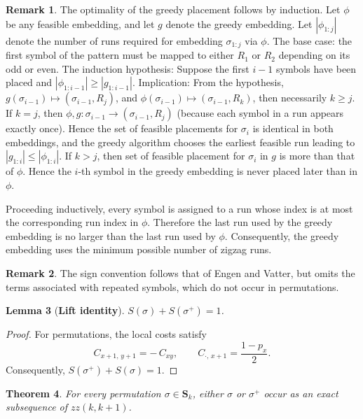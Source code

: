 \documentclass[a4paper,12pt]{article}
\newtheorem{theorem}{Theorem}[section]
\newtheorem{lemma}[theorem]{Lemma}
\theoremstyle{definition}
\newtheorem{rem}[theorem]{Remark}
\numberwithin{equation}{section}
\begin{document}
\begin{rem}
The optimality of the greedy placement follows by induction. 
Let $\phi$ be any
feasible embedding, and let $g$ denote the greedy embedding. Let $|\phi_{1:j}|$ denote the number of runs required for embedding $\sigma_{1:j}$ via $\phi$.
The base case:  the first symbol of the pattern must be mapped to either $R_1$ or $R_2$ depending on its odd or even.  
The induction hypothesis: Suppose the first
$i-1$ symbols have been placed and $|\phi_{1:i-1}| \geq |g_{1:i-1}|$. 
Implication: 
From the hypothesis, $
g(\sigma_{i-1}) \mapsto (\sigma_{i-1},R_j)$, and $ 
\phi(\sigma_{i-1}) \mapsto (\sigma_{i-1},R_k)$,
then necessarily $k\ge j$. If $k=j$, then $\phi,g : \sigma_{i-1} \to (\sigma_{i-1},R_j)$ (because each symbol in a run appears exactly once). 
Hence the set of feasible placements for $\sigma_i$ is identical in both embeddings, and the greedy algorithm chooses the earliest feasible run leading to $|g_{1:i}| \leq |\phi_{1:i}|$. If $k>j$, then set of feasible placement for $\sigma_i$ in $g$ is more than that of $ \phi$. Hence the $i$-th symbol in the greedy embedding is never placed
later than in $\phi$.

Proceeding inductively, every symbol is assigned to a run whose index is at
most the corresponding run index in $\phi$. Therefore the last run used by the
greedy embedding is no larger than the last run used by $\phi$. Consequently,
the greedy embedding uses the minimum possible number of zigzag runs.

\end{rem}






\begin{rem}
The sign convention follows that of Engen and Vatter, but omits the terms associated with repeated symbols, which do not occur in permutations.    
\end{rem}

\begin{lemma}[\textbf{Lift identity}]  $S(\sigma) + S(\sigma^+) = 1$.
\end{lemma}
\begin{proof}
    For permutations, the local costs satisfy 
\[
C_{x+1,\,y+1} = -\,C_{xy}, \qquad
C_{\cdot,\,x+1} = \frac{1 - p_x}{2}.
\]
Consequently, $S(\sigma^+) + S(\sigma) = 1.$
\end{proof}


\begin{theorem}\cite[Proposition 10]{engen2020containing}
    For every permutation $\sigma \in \mathbf{S}_k$, either $\sigma$ or $\sigma^+$ occur as an exact subsequence of $zz(k,k+1)$.
\end{theorem}\label{embed-subseq}
\end{document}
